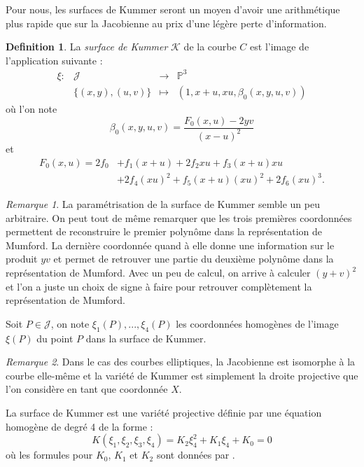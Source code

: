 \documentclass[a4paper,12pt]{article}
\theoremstyle{definition}
\newtheorem{definition}{Definition}[section]
\theoremstyle{remark}
\newtheorem{remarque}{Remarque}
\numberwithin{equation}{section}
\begin{document}
Pour nous, les surfaces de Kummer seront un moyen d'avoir une arithmétique plus rapide que sur la Jacobienne au prix d'une légère perte d'information.

\begin{definition}
La \emph{surface de Kummer} $\mathcal{K}$ de la courbe $C$ est l'image de l'application suivante :
\begin{equation*}
\begin{array}{lrcl}
\xi : &\mathcal{J} & \longrightarrow & \mathbb{P}^3 \\
& \{(x,y),(u,v)\} & \longmapsto & (1,x+u,xu,\beta_0(x,y,u,v))
\end{array}
\end{equation*}
où l'on note
$$\beta_0(x,y,u,v) = \frac{F_0(x,u)-2yv}{(x-u)^2}$$
et
\begin{align*}
F_0(x,u)=2f_0&+f_1(x+u)+2f_2xu+f_3(x+u)xu \\
&+2f_4(xu)^2+f_5(x+u)(xu)^2+2f_6(xu)^3.
\end{align*}
\end{definition}

\begin{remarque}
La paramétrisation de la surface de Kummer semble un peu arbitraire. On peut tout de même remarquer que les trois premières coordonnées permettent de reconstruire le premier polynôme dans la représentation de Mumford. La dernière coordonnée quand à elle donne une information sur le produit $yv$ et permet de retrouver une partie du deuxième polynôme dans la représentation de Mumford. Avec un peu de calcul, on arrive à calculer $(y+v)^2$ et l'on a juste un choix de signe à faire pour retrouver complètement la représentation de Mumford.
\end{remarque}

Soit $P \in \mathcal{J}$, on note $\xi_1(P),...,\xi_4(P)$ les coordonnées homogènes de l'image $\xi(P)$ du point $P$ dans la surface de Kummer.

\begin{remarque}
Dans le cas des courbes elliptiques, la Jacobienne est isomorphe à la courbe elle-même et la variété de Kummer est simplement la droite projective que l'on considère en tant que coordonnée $X$.
\end{remarque}

La surface de Kummer est une variété projective définie par une équation homogène de degré 4 de la forme :
$$K(\xi_1,\xi_2,\xi_3,\xi_4)=K_2\xi_4^2 + K_1\xi_4 + K_0 = 0$$
où les formules pour $K_0$, $K_1$ et $K_2$ sont données par \citet{eqKum}.
\end{document}
